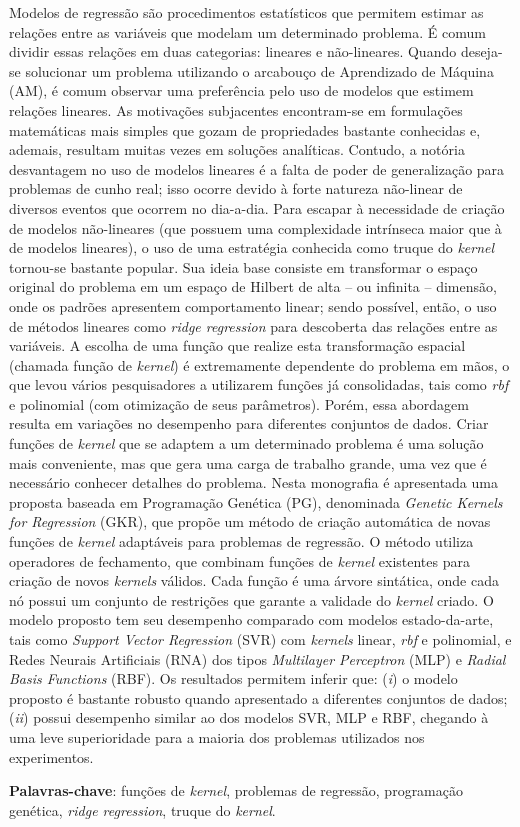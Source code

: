\setlength{\absparsep}{18pt} %
\begin{resumo}
    Modelos de regressão são procedimentos estatísticos que permitem estimar as relações entre as variáveis que modelam um determinado problema. É comum dividir essas relações em duas categorias: lineares e não-lineares. Quando deseja-se solucionar um problema utilizando o arcabouço de Aprendizado de Máquina (AM), é comum observar uma preferência pelo uso de modelos que estimem relações lineares. As motivações subjacentes encontram-se em formulações matemáticas mais simples que gozam de propriedades bastante conhecidas e, ademais, resultam muitas vezes em soluções analíticas. Contudo, a notória desvantagem no uso de modelos lineares é a falta de poder de generalização para problemas de cunho real; isso ocorre devido à forte natureza não-linear de diversos eventos que ocorrem no dia-a-dia. Para escapar à necessidade de criação de modelos não-lineares (que possuem uma complexidade intrínseca maior que à de modelos lineares), o uso de uma estratégia conhecida como truque do \textit{kernel} tornou-se bastante popular. Sua ideia base consiste em transformar o espaço original do problema em um espaço de Hilbert de alta -- ou infinita -- dimensão, onde os padrões apresentem comportamento linear; sendo possível, então, o uso de métodos lineares como \textit{ridge regression} para descoberta das relações entre as variáveis. A escolha de uma função que realize esta transformação espacial (chamada função de \textit{kernel}) é extremamente dependente do problema em mãos, o que levou vários pesquisadores a utilizarem funções já consolidadas, tais como \textit{rbf} e polinomial (com otimização de seus parâmetros). Porém, essa abordagem resulta em variações no desempenho para diferentes conjuntos de dados. Criar funções de \textit{kernel} que se adaptem a um determinado problema é uma solução mais conveniente, mas que gera uma carga de trabalho grande, uma vez que é necessário conhecer detalhes do problema. Nesta monografia é apresentada uma proposta baseada em Programação Genética (PG), denominada \textit{Genetic Kernels for Regression} (GKR), que propõe um método de criação automática de novas funções de \textit{kernel} adaptáveis para problemas de regressão. O método utiliza operadores de fechamento, que combinam funções de \textit{kernel} existentes para criação de novos \textit{kernels} válidos. Cada função é uma árvore sintática, onde cada nó possui um conjunto de restrições que garante a validade do \textit{kernel} criado. O modelo proposto tem seu desempenho comparado com modelos estado-da-arte, tais como \textit{Support Vector Regression} (SVR) com \textit{kernels} linear, \textit{rbf} e polinomial, e Redes Neurais Artificiais (RNA) dos tipos \textit{Multilayer Perceptron} (MLP) e \textit{Radial Basis Functions} (RBF). Os resultados permitem inferir que: (\textit{i}) o modelo proposto é bastante robusto quando apresentado a diferentes conjuntos de dados; (\textit{ii}) possui desempenho similar ao dos modelos SVR, MLP e RBF, chegando à uma leve superioridade para a maioria dos problemas utilizados nos experimentos.
    
    \textbf{Palavras-chave}: funções de \textit{kernel}, problemas de regressão, programação genética, \textit{ridge regression}, truque do \textit{kernel}.
\end{resumo}
